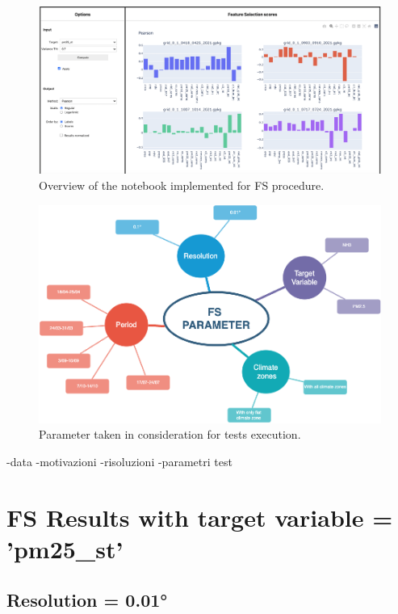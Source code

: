 \begin{figure}[H]
    \centering
    \includegraphics[scale=0.40]{images/notebook.png}
    \caption{Overview of the notebook implemented for FS procedure.}
    \label{fig:notebook}
\end{figure}



\begin{figure}
    \centering
    \includegraphics[width=.9\textwidth]{images/test_param.png}
    \caption{Parameter taken in consideration for tests execution.}
    \label{fig:test_params}
\end{figure}
-data
-motivazioni
-risoluzioni
-parametri test
\section{FS Results with target variable = 'pm25\_st'}
\label{sec:pm25}
\subsection{Resolution = 0.01°}
